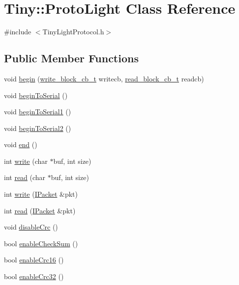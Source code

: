 \hypertarget{classTiny_1_1ProtoLight}{}\section{Tiny\+:\+:Proto\+Light Class Reference}
\label{classTiny_1_1ProtoLight}


{\ttfamily \#include $<$Tiny\+Light\+Protocol.\+h$>$}

\subsection*{Public Member Functions}
\begin{DoxyCompactItemize}
\item 
void \hyperlink{classTiny_1_1ProtoLight_ad27dfcef54a8316228469ef0a4267962}{begin} (\hyperlink{tiny__types_8h_aafd634660bba76cace57a8f9b01e044d}{write\+\_\+block\+\_\+cb\+\_\+t} writecb, \hyperlink{tiny__types_8h_a15bec127d9ee63658563d62e92b5261b}{read\+\_\+block\+\_\+cb\+\_\+t} readcb)
\item 
void \hyperlink{classTiny_1_1ProtoLight_a50bf63fe1891edda48980ca2893485d7}{begin\+To\+Serial} ()
\item 
void \hyperlink{classTiny_1_1ProtoLight_a4de4d11cc7f68dcefa5ca1357e6dfc35}{begin\+To\+Serial1} ()
\item 
void \hyperlink{classTiny_1_1ProtoLight_a40a4d002f53c842b1a3577a8a9c8eebb}{begin\+To\+Serial2} ()
\item 
void \hyperlink{classTiny_1_1ProtoLight_a948b2a0e37177b7434581adc64b36497}{end} ()
\item 
int \hyperlink{classTiny_1_1ProtoLight_a46a27ee9d0b55c88672c98abf04dbdce}{write} (char $\ast$buf, int size)
\item 
int \hyperlink{classTiny_1_1ProtoLight_acf18a8b73ee6c6394270c903ad7882b8}{read} (char $\ast$buf, int size)
\item 
int \hyperlink{classTiny_1_1ProtoLight_ad980940fd5eca35204a70a5cfe5ccccd}{write} (\hyperlink{classTiny_1_1IPacket}{I\+Packet} \&pkt)
\item 
int \hyperlink{classTiny_1_1ProtoLight_aa040cbf16f9c074959fb410db6858b9b}{read} (\hyperlink{classTiny_1_1IPacket}{I\+Packet} \&pkt)
\item 
void \hyperlink{classTiny_1_1ProtoLight_af93e0591ca33137ad79ffb054953001c}{disable\+Crc} ()
\item 
bool \hyperlink{classTiny_1_1ProtoLight_ad7b4ef5a43c187f0d1915efe7450bc40}{enable\+Check\+Sum} ()
\item 
bool \hyperlink{classTiny_1_1ProtoLight_a110b654e476691518790edcc5bf1bd80}{enable\+Crc16} ()
\item 
bool \hyperlink{classTiny_1_1ProtoLight_a8ae8a3ace46234a65f83c564dc56fd26}{enable\+Crc32} ()
\end{DoxyCompactItemize}


